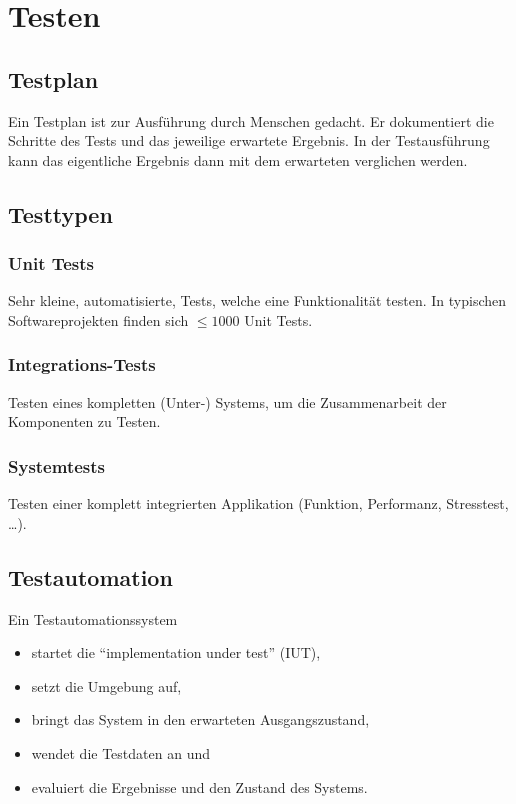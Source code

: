 	\section{Testen}
		\subsection{Testplan}
			Ein Testplan ist zur Ausführung durch Menschen gedacht. Er dokumentiert die Schritte des Tests und das jeweilige erwartete Ergebnis. In der Testausführung kann das eigentliche Ergebnis dann mit dem erwarteten verglichen werden.

		\subsection{Testtypen}
			\subsubsection{Unit Tests}
				Sehr kleine, automatisierte, Tests, welche eine Funktionalität testen. In typischen Softwareprojekten finden sich $ \leq 1000 $ Unit Tests.

			\subsubsection{Integrations-Tests}
				Testen eines kompletten (Unter-) Systems, um die Zusammenarbeit der Komponenten zu Testen.

			\subsubsection{Systemtests}
				Testen einer komplett integrierten Applikation (Funktion, Performanz, Stresstest, \dots).

		\subsection{Testautomation}
			Ein Testautomationssystem
			\begin{itemize}
				\item startet die \enquote{implementation under test} (IUT),
				\item setzt die Umgebung auf,
				\item bringt das System in den erwarteten Ausgangszustand,
				\item wendet die Testdaten an und
				\item evaluiert die Ergebnisse und den Zustand des Systems.
			\end{itemize}

